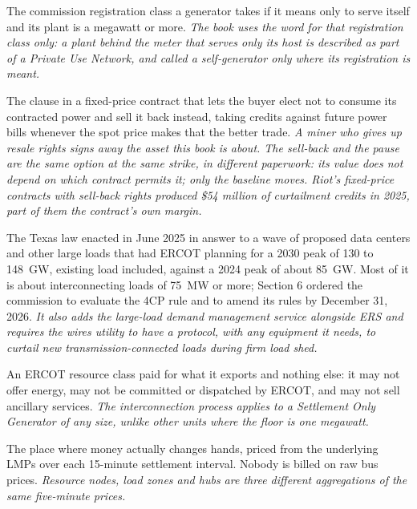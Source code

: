 \begin{description}[leftmargin=0pt,style=unboxed,itemsep=0.35em,parsep=0.15em]
\item[self-generator] \hypertarget{glossary:self-generator}{}The commission registration class a generator takes if it means only to serve itself and its plant is a megawatt or more. \emph{The book uses the word for that registration class only: a plant behind the meter that serves only its host is described as part of a Private Use Network, and called a self-generator only where its registration is meant.}
\item[sell-back clause] \hypertarget{glossary:sell-back-clause}{}The clause in a fixed-price contract that lets the buyer elect not to consume its contracted power and sell it back instead, taking credits against future power bills whenever the spot price makes that the better trade. \emph{A miner who gives up resale rights signs away the asset this book is about. The sell-back and the pause are the same option at the same strike, in different paperwork: its value does not depend on which contract permits it; only the baseline moves. Riot's fixed-price contracts with sell-back rights produced \$54 million of curtailment credits in 2025, part of them the contract's own margin.}
\item[Senate Bill 6 (SB 6)] \hypertarget{glossary:senate-bill-6}{}The Texas law enacted in June 2025 in answer to a wave of proposed data centers and other large loads that had ERCOT planning for a 2030 peak of 130 to 148~GW, existing load included, against a 2024 peak of about 85~GW. Most of it is about interconnecting loads of 75~MW or more; Section 6 ordered the commission to evaluate the 4CP rule and to amend its rules by December 31, 2026. \emph{It also adds the large-load demand management service alongside ERS and requires the wires utility to have a protocol, with any equipment it needs, to curtail new transmission-connected loads during firm load shed.}
\item[Settlement Only Generator (SOG)] \hypertarget{glossary:settlement-only-generator}{}An ERCOT resource class paid for what it exports and nothing else: it may not offer energy, may not be committed or dispatched by ERCOT, and may not sell ancillary services. \emph{The interconnection process applies to a Settlement Only Generator of any size, unlike other units where the floor is one megawatt.}
\item[settlement point] \hypertarget{glossary:settlement-point}{}The place where money actually changes hands, priced from the underlying LMPs over each 15-minute settlement interval. Nobody is billed on raw bus prices. \emph{Resource nodes, load zones and hubs are three different aggregations of the same five-minute prices.}

\end{description}
